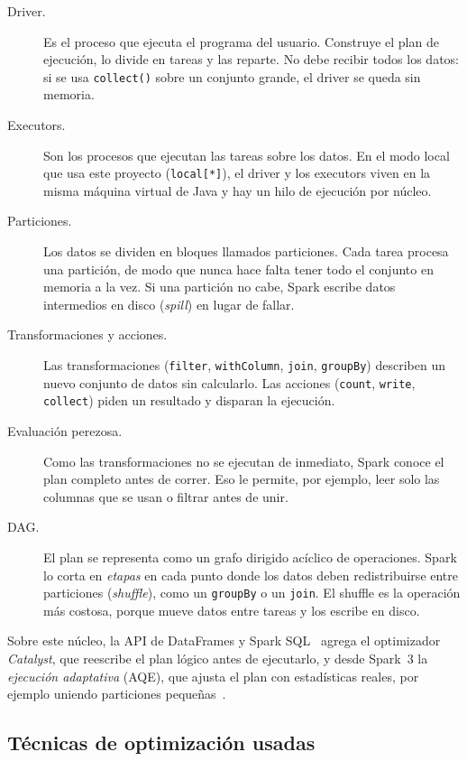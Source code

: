 \documentclass[11pt,a4paper]{article}
\begin{document}
\begin{description}
  \item[Driver.] Es el proceso que ejecuta el programa del usuario. Construye el plan de
  ejecución, lo divide en tareas y las reparte. No debe recibir todos los datos: si se
  usa \texttt{collect()} sobre un conjunto grande, el driver se queda sin memoria.
  \item[Executors.] Son los procesos que ejecutan las tareas sobre los datos. En el modo
  local que usa este proyecto (\texttt{local[*]}), el driver y los executors viven en la
  misma máquina virtual de Java y hay un hilo de ejecución por núcleo.
  \item[Particiones.] Los datos se dividen en bloques llamados particiones. Cada tarea
  procesa una partición, de modo que nunca hace falta tener todo el conjunto en memoria a
  la vez. Si una partición no cabe, Spark escribe datos intermedios en disco (\emph{spill})
  en lugar de fallar.
  \item[Transformaciones y acciones.] Las transformaciones (\texttt{filter},
  \texttt{withColumn}, \texttt{join}, \texttt{groupBy}) describen un nuevo conjunto de datos
  sin calcularlo. Las acciones (\texttt{count}, \texttt{write}, \texttt{collect}) piden un
  resultado y disparan la ejecución.
  \item[Evaluación perezosa.] Como las transformaciones no se ejecutan de inmediato, Spark
  conoce el plan completo antes de correr. Eso le permite, por ejemplo, leer solo las
  columnas que se usan o filtrar antes de unir.
  \item[DAG.] El plan se representa como un grafo dirigido acíclico de operaciones. Spark lo
  corta en \emph{etapas} en cada punto donde los datos deben redistribuirse entre
  particiones (\emph{shuffle}), como un \texttt{groupBy} o un \texttt{join}. El shuffle es la
  operación más costosa, porque mueve datos entre tareas y los escribe en disco.
\end{description}

Sobre este núcleo, la API de DataFrames y Spark SQL~\cite{armbrust2015} agrega el optimizador
\emph{Catalyst}, que reescribe el plan lógico antes de ejecutarlo, y desde Spark~3 la
\emph{ejecución adaptativa} (AQE), que ajusta el plan con estadísticas reales, por ejemplo
uniendo particiones pequeñas~\cite{sparkdocs}.

\subsection{Técnicas de optimización usadas}
\end{document}
